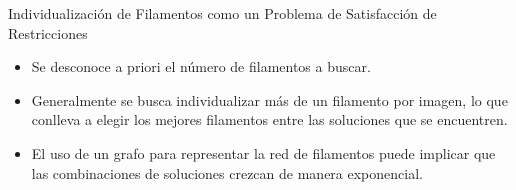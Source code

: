 \begin{frame}{Individualizaci\'on de Filamentos como un Problema de Satisfacci\'on de Restricciones}
    \begin{itemize}
    \item Se desconoce a priori el n\'umero de filamentos a buscar.%
    \item Generalmente se busca individualizar m\'as de un filamento por imagen, lo que conlleva a elegir los mejores filamentos entre las soluciones que se encuentren.
    \item El uso de un grafo para representar la red de filamentos puede implicar que las combinaciones de soluciones crezcan de manera exponencial.
\end{itemize}
\end{frame}





